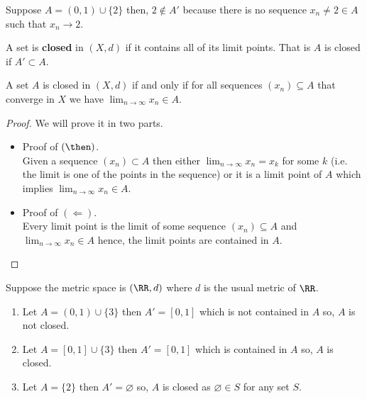 \documentclass[12pt, a4paper]{article}
\begin{document}
\begin{example}
    Suppose \(A = (0,1) \cup \{2\}\) then, \(2 \not\in A'\) because there is no sequence \(x_n \neq 2 \in A\) such that \(x_n \to 2\).
\end{example}

\begin{definition}
    A set is \textbf{closed} in \((X,d)\) if it contains all of its limit points. That is \(A\) is closed if \(A' \subset A\).
\end{definition}

\begin{mdlemma}
    A set \(A\) is closed in \((X,d)\) if and only if for all sequences \((x_n) \subseteq A\) that converge in \(X\) we have \(\lim_{n \to \infty} x_n \in A\).
\end{mdlemma}

\begin{proof}
    We will prove it in two parts.
    \begin{itemize}
        \item Proof of \((\then)\). \\
        Given a sequence \((x_n) \subset A\) then either \(\lim_{n \to \infty} x_n = x_k\) for some \(k\) (i.e. the limit is one of the points in the sequence) or it is a limit point of \(A\) which implies \(\lim_{n \to \infty} x_n \in A\).
        \item Proof of \((\Leftarrow)\).\\
        Every limit point is the limit of some sequence \((x_n) \subseteq A\) and \(\lim_{n \to \infty} x_n \in A\) hence, the limit points are contained in \(A\).
    \end{itemize}
\end{proof}

\begin{mdexample}
    Suppose the metric space is \((\RR,d)\) where \(d\) is the usual metric of \(\RR\).
    \begin{enumerate}
        \item Let \(A = (0,1) \cup \{3\}\) then \(A' = [0,1]\) which is not contained in \(A\) so, \(A\) is not closed.
        \item Let \(A = [0,1] \cup \{3\}\) then \(A'=[0,1]\) which is contained in \(A\) so, \(A\) is closed.
        \item Let \(A = \{2\}\) then \(A' = \varnothing\) so, \(A\) is closed as \(\varnothing \in S\) for any set \(S\).
    \end{enumerate}
\end{mdexample}
\end{document}
